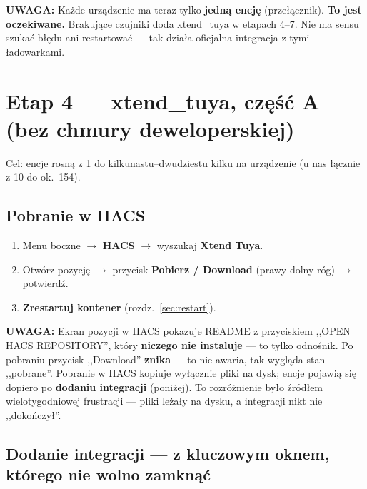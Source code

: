 \documentclass[11pt,a4paper]{article}
\newcommand{\uwaga}[1]{\par\medskip\noindent\textcolor{warnred}{\textbf{UWAGA:}} #1\par\medskip}
\begin{document}
\uwaga{Każde urządzenie ma teraz tylko \textbf{jedną encję} (przełącznik). \textbf{To jest oczekiwane.} Brakujące czujniki doda xtend\_tuya w etapach 4--7. Nie ma sensu szukać błędu ani restartować --- tak działa oficjalna integracja z tymi ładowarkami.}

\section{Etap 4 --- xtend\_tuya, część A (bez chmury deweloperskiej)}
\label{sec:etap4}

Cel: encje rosną z 1 do kilkunastu--dwudziestu kilku na urządzenie (u nas łącznie z 10 do ok.~154).

\subsection{Pobranie w HACS}

\begin{enumerate}
\item Menu boczne $\to$ \textbf{HACS} $\to$ wyszukaj \textbf{Xtend Tuya}.
\item Otwórz pozycję $\to$ przycisk \textbf{Pobierz / Download} (prawy dolny róg) $\to$ potwierdź.
\item \textbf{Zrestartuj kontener} (rozdz.~\ref{sec:restart}).
\end{enumerate}

\uwaga{Ekran pozycji w HACS pokazuje README z przyciskiem ,,OPEN HACS REPOSITORY'', który \textbf{niczego nie instaluje} --- to tylko odnośnik. Po pobraniu przycisk ,,Download'' \textbf{znika} --- to nie awaria, tak wygląda stan ,,pobrane''. Pobranie w HACS kopiuje wyłącznie pliki na dysk; encje pojawią się dopiero po \textbf{dodaniu integracji} (poniżej). To rozróżnienie było źródłem wielotygodniowej frustracji --- pliki leżały na dysku, a integracji nikt nie ,,dokończył''.}

\subsection{Dodanie integracji --- z kluczowym oknem, którego nie wolno zamknąć}
\label{sec:krytyczne-okno}
\end{document}

